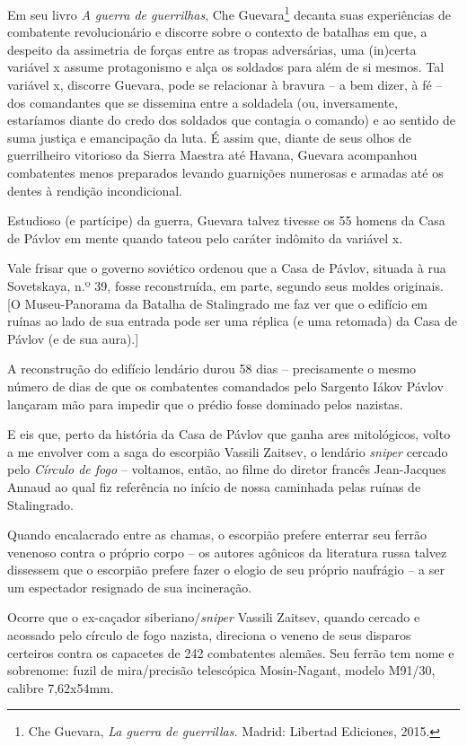Em seu livro \emph{A guerra de guerrilhas}, Che Guevara\footnote{Che
  Guevara, \emph{La guerra de guerrillas.} Madrid: Libertad Ediciones,
  2015.} decanta suas experiências de combatente revolucionário e
discorre sobre o contexto de batalhas em que, a despeito da assimetria
de forças entre as tropas adversárias, uma (in)certa variável x assume
protagonismo e alça os soldados para além de si mesmos. Tal variável x,
discorre Guevara, pode se relacionar à bravura -- a bem dizer, à fé --
dos comandantes que se dissemina entre a soldadela (ou, inversamente,
estaríamos diante do credo dos soldados que contagia o comando) e ao
sentido de suma justiça e emancipação da luta. É assim que, diante de
seus olhos de guerrilheiro vitorioso da Sierra Maestra até Havana,
Guevara acompanhou combatentes menos preparados levando guarnições
numerosas e armadas até os dentes à rendição incondicional.

Estudioso (e partícipe) da guerra, Guevara talvez tivesse os 55 homens
da Casa de Pávlov em mente quando tateou pelo caráter indômito da
variável x.

Vale frisar que o governo soviético ordenou que a Casa de Pávlov,
situada à rua Sovetskaya, n.º 39, fosse reconstruída, em parte, segundo
seus moldes originais. {[}O Museu-Panorama da Batalha de Stalingrado me
faz ver que o edifício em ruínas ao lado de sua entrada pode ser uma
réplica (e uma retomada) da Casa de Pávlov (e de sua aura).{]}

A reconstrução do edifício lendário durou 58 dias -- precisamente o
mesmo número de dias de que os combatentes comandados pelo Sargento
Iákov Pávlov lançaram mão para impedir que o prédio fosse dominado pelos
nazistas.

E eis que, perto da história da Casa de Pávlov que ganha ares
mitológicos, volto a me envolver com a saga do escorpião Vassili
Zaitsev, o lendário \emph{sniper} cercado pelo \emph{Círculo de fogo} --
voltamos, então, ao filme do diretor francês Jean-Jacques Annaud ao qual
fiz referência no início de nossa caminhada pelas ruínas de Stalingrado.

Quando encalacrado entre as chamas, o escorpião prefere enterrar seu
ferrão venenoso contra o próprio corpo -- os autores agônicos da
literatura russa talvez dissessem que o escorpião prefere fazer o elogio
de seu próprio naufrágio -- a ser um espectador resignado de sua
incineração.

Ocorre que o ex-caçador siberiano/\emph{sniper} Vassili Zaitsev, quando
cercado e acossado pelo círculo de fogo nazista, direciona o veneno de
seus disparos certeiros contra os capacetes de 242 combatentes alemães.
Seu ferrão tem nome e sobrenome: fuzil de mira/precisão
telescópica Mosin-Nagant, modelo M91/30, calibre 7,62x54mm.


